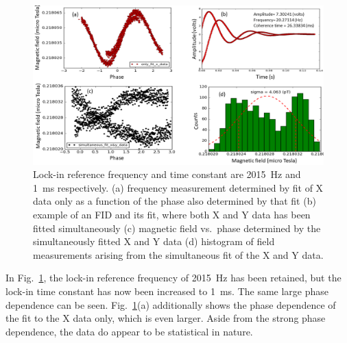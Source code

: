 \begin{figure}%
\centering\includegraphics[width=\linewidth]{figures/freq_2015_simultaneous_fit_1ms.png}
\caption{Lock-in reference frequency and time constant are 2015~Hz and
  1~ms respectively.  (a) frequency measurement determined by fit of X
  data only as a function of the phase also determined by that fit (b)
  example of an FID and its fit, where both X and Y data has been
  fitted simultaneously (c) magnetic field vs.~phase determined by the
  simultaneously fitted X and Y data (d) histogram of field
  measurements arising from the simultaneous fit of the X and Y
  data.\label{fig:freq_2015_1ms}}
\end{figure}

In Fig.~\ref{fig:freq_2015_1ms}, the lock-in reference frequency of
2015~Hz has been retained, but the lock-in time constant has now been
increased to 1~ms.  The same large phase dependence can be seen.
Fig.~\ref{fig:freq_2015_1ms}(a) additionally shows the phase
dependence of the fit to the X data only, which is even larger.  Aside
from the strong phase dependence, the data do appear to be
statistical in nature.


